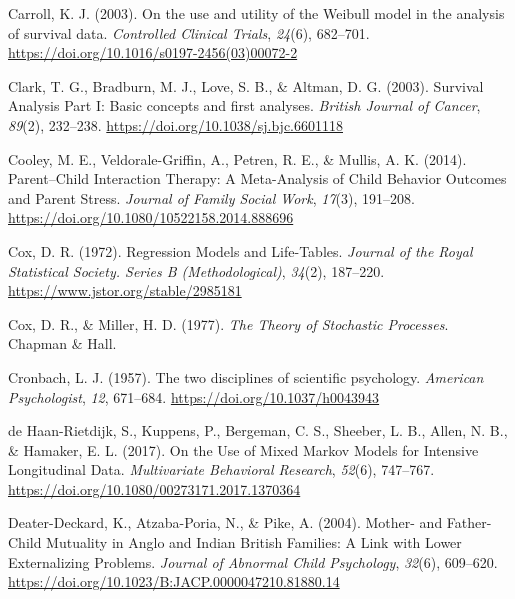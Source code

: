 \documentclass[12pt]{./styles/outhesis}
\begin{document}
\leavevmode{}%
Carroll, K. J. (2003). On the use and utility of the {Weibull} model in
the analysis of survival data. \emph{Controlled Clinical Trials},
\emph{24}(6), 682--701.
\url{https://doi.org/10.1016/s0197-2456(03)00072-2}

\leavevmode{}%
Clark, T. G., Bradburn, M. J., Love, S. B., \& Altman, D. G. (2003).
Survival {Analysis Part I}: {Basic} concepts and first analyses.
\emph{British Journal of Cancer}, \emph{89}(2), 232--238.
\url{https://doi.org/10.1038/sj.bjc.6601118}

\leavevmode{}%
Cooley, M. E., Veldorale-Griffin, A., Petren, R. E., \& Mullis, A. K.
(2014). Parent--{Child Interaction Therapy}: {A Meta-Analysis} of {Child
Behavior Outcomes} and {Parent Stress}. \emph{Journal of Family Social
Work}, \emph{17}(3), 191--208.
\url{https://doi.org/10.1080/10522158.2014.888696}

\leavevmode{}%
Cox, D. R. (1972). Regression {Models} and {Life-Tables}. \emph{Journal
of the Royal Statistical Society. Series B (Methodological)},
\emph{34}(2), 187--220. \url{https://www.jstor.org/stable/2985181}

\leavevmode{}%
Cox, D. R., \& Miller, H. D. (1977). \emph{The {Theory} of {Stochastic
Processes}}. Chapman \& Hall.

\leavevmode{}%
Cronbach, L. J. (1957). The two disciplines of scientific psychology.
\emph{American Psychologist}, \emph{12}, 671--684.
\url{https://doi.org/10.1037/h0043943}

\leavevmode{}%
de Haan-Rietdijk, S., Kuppens, P., Bergeman, C. S., Sheeber, L. B.,
Allen, N. B., \& Hamaker, E. L. (2017). On the {Use} of {Mixed Markov
Models} for {Intensive Longitudinal Data}. \emph{Multivariate Behavioral
Research}, \emph{52}(6), 747--767.
\url{https://doi.org/10.1080/00273171.2017.1370364}

\leavevmode{}%
Deater-Deckard, K., Atzaba-Poria, N., \& Pike, A. (2004). Mother- and
{Father-Child Mutuality} in {Anglo} and {Indian British Families}: {A
Link} with {Lower Externalizing Problems}. \emph{Journal of Abnormal
Child Psychology}, \emph{32}(6), 609--620.
\url{https://doi.org/10.1023/B:JACP.0000047210.81880.14}
\end{document}
